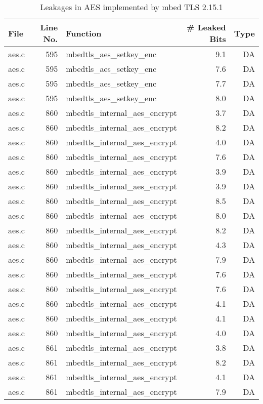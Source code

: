 \begin{table}[h!]
\centering\tiny\scriptsize
\caption{Leakages in AES implemented by mbed TLS 2.15.1}\label{tab:AESmbed TLS2.15.1}
\begin{tabular}{lrlrr}
\hline
\textbf{File} & \textbf{Line No.} & \textbf{Function} & \textbf{\# Leaked Bits} & \textbf{Type} \\\hline
aes.c& 595&mbedtls\_aes\_setkey\_enc&9.1 &DA\\
aes.c& 595&mbedtls\_aes\_setkey\_enc&7.6 &DA\\
aes.c& 595&mbedtls\_aes\_setkey\_enc&7.7 &DA\\
aes.c& 595&mbedtls\_aes\_setkey\_enc&8.0 &DA\\
aes.c& 860&mbedtls\_internal\_aes\_encrypt&3.7 &DA\\
aes.c& 860&mbedtls\_internal\_aes\_encrypt&8.2 &DA\\
aes.c& 860&mbedtls\_internal\_aes\_encrypt&4.0 &DA\\
aes.c& 860&mbedtls\_internal\_aes\_encrypt&7.6 &DA\\
aes.c& 860&mbedtls\_internal\_aes\_encrypt&3.9 &DA\\
aes.c& 860&mbedtls\_internal\_aes\_encrypt&3.9 &DA\\
aes.c& 860&mbedtls\_internal\_aes\_encrypt&8.5 &DA\\
aes.c& 860&mbedtls\_internal\_aes\_encrypt&8.0 &DA\\
aes.c& 860&mbedtls\_internal\_aes\_encrypt&8.2 &DA\\
aes.c& 860&mbedtls\_internal\_aes\_encrypt&4.3 &DA\\
aes.c& 860&mbedtls\_internal\_aes\_encrypt&7.9 &DA\\
aes.c& 860&mbedtls\_internal\_aes\_encrypt&7.6 &DA\\
aes.c& 860&mbedtls\_internal\_aes\_encrypt&7.6 &DA\\
aes.c& 860&mbedtls\_internal\_aes\_encrypt&4.1 &DA\\
aes.c& 860&mbedtls\_internal\_aes\_encrypt&4.1 &DA\\
aes.c& 860&mbedtls\_internal\_aes\_encrypt&4.0 &DA\\
aes.c& 861&mbedtls\_internal\_aes\_encrypt&3.8 &DA\\
aes.c& 861&mbedtls\_internal\_aes\_encrypt&8.2 &DA\\
aes.c& 861&mbedtls\_internal\_aes\_encrypt&4.1 &DA\\
aes.c& 861&mbedtls\_internal\_aes\_encrypt&7.9 &DA\\

\end{tabular}
\end{table}
